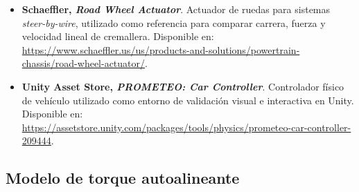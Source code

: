 \documentclass{article}
\begin{document}
\begin{itemize}
	    \item \hypertarget{ref:schaeffler-rwa}{}\textbf{Schaeffler, \textit{Road Wheel Actuator}}. Actuador de ruedas para sistemas \textit{steer-by-wire}, utilizado como referencia para comparar carrera, fuerza y velocidad lineal de cremallera. Disponible en: \url{https://www.schaeffler.us/us/products-and-solutions/powertrain-chassis/road-wheel-actuator/}.

	    \item \hypertarget{ref:prometeo-car-controller}{}\textbf{Unity Asset Store, \textit{PROMETEO: Car Controller}}. Controlador físico de vehículo utilizado como entorno de validación visual e interactiva en Unity. Disponible en: \url{https://assetstore.unity.com/packages/tools/physics/prometeo-car-controller-209444}.
\end{itemize}

\subsection*{Modelo de torque autoalineante}
\end{document}
